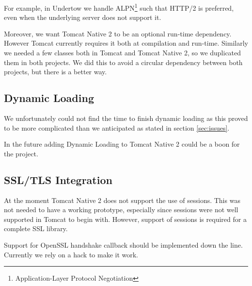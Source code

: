 \documentclass[11pt,a4paper,bibliography=totocnumbered]{scrartcl}
\def\mytitle{Tomcat Native 2}
\begin{document}
For example, in Undertow we handle ALPN\footnote{Application-Layer Protocol Negotiation} such that HTTP/2 is preferred, even when the underlying server does not support it.

Moreover, we want \mytitle{} to be an optional run-time dependency. However Tomcat currently requires it both at compilation and run-time. Similarly we needed a few classes both in Tomcat and \mytitle{}, so we duplicated them in both projects. We did this to avoid a circular dependency between both projects, but there is a better way.

\subsection{Dynamic Loading}
We unfortunately could not find the time to finish dynamic loading as this proved to be more complicated than we anticipated as stated in section \ref{sec:issues}.

In the future adding Dynamic Loading to \mytitle{} could be a boon for the project.

\subsection{SSL/TLS Integration}
At the moment \mytitle{} does not support the use of sessions. This was not needed to have a working prototype, especially since sessions were not well supported in Tomcat to begin with. However, support of sessions is required for a complete SSL library.

Support for OpenSSL handshake callback should be implemented down the line. Currently we rely on a hack to make it work.
\newpage
\printbibliography
\end{document}
